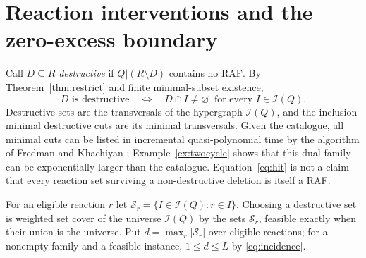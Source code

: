 \documentclass[11pt,a4paper]{article}
\theoremstyle{plain}
\theoremstyle{definition}
\theoremstyle{remark}
\newcommand{\Irr}{\mathcal I}
\begin{document}
\section{Reaction interventions and the zero-excess boundary}\label{sec:cuts}

Call $D\subseteq R$ \emph{destructive} if $Q|(R\setminus D)$ contains no RAF. By Theorem~\ref{thm:restrict} and finite minimal-subset existence,
\begin{equation}\label{eq:hit}
 D\text{ is destructive}\quad\Longleftrightarrow\quad D\cap I\ne\varnothing\ \text{ for every } I\in\Irr(Q).
\end{equation}
Destructive sets are the transversals of the hypergraph $\Irr(Q)$, and the inclusion-minimal destructive cuts are its minimal transversals. Given the catalogue, all minimal cuts can be listed in incremental quasi-polynomial time by the algorithm of Fredman and Khachiyan \cite{fredman1996complexity}; Example~\ref{ex:twocycle} shows that this dual family can be exponentially larger than the catalogue. Equation~\eqref{eq:hit} is not a claim that every reaction set surviving a non-destructive deletion is itself a RAF.

For an eligible reaction $r$ let $\mathcal S_r=\{I\in\Irr(Q):r\in I\}$. Choosing a destructive set is weighted set cover of the universe $\Irr(Q)$ by the sets $\mathcal S_r$, feasible exactly when their union is the universe. Put $d=\max_r|\mathcal S_r|$ over eligible reactions; for a nonempty family and a feasible instance, $1\le d\le L$ by \eqref{eq:incidence}.
\end{document}
